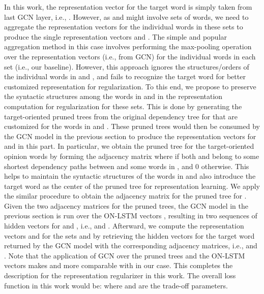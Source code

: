 \documentclass[11pt,a4paper]{article}
\begin{document}
In this work, the representation vector for the target word is simply taken from last GCN layer, i.e., . However, as  and  might involve sets of words, we need to aggregate the representation vectors for the individual words in these sets to produce the single representation vectors  and . The simple and popular aggregation method in this case involves performing the max-pooling operation over the representation vectors (i.e., from GCN) for the individual words in each set (i.e., our baseline). However, this approach ignores the structures/orders of the individual words in  and , and fails to recognize the target word for better customized representation for regularization. To this end, we propose to preserve the syntactic structures among the words in  and  in the representation computation for regularization for these sets. This is done by generating the target-oriented pruned trees from the original dependency tree for  that are customized for the words in  and . These pruned trees would then be consumed by the GCN model in the previous section to produce the representation vectors for  and  in this part. In particular, we obtain the pruned tree for the target-oriented opinion words  by forming the adjacency matrix  where  if both  and  belong to some shortest dependency paths between  and some words in , and 0 otherwise. This helps to maintain the syntactic structures of the words in  and also introduce the target word  as the center of the pruned tree for representation learning. We apply the similar procedure to obtain the adjacency matrix  for the pruned tree for . Given the two adjacency matrices for the pruned trees, the GCN model in the previous section is run over the ON-LSTM vectors , resulting in two sequences of hidden vectors for  and , i.e.,  and . Afterward, we compute the representation vectors  and  for the sets  and  by retrieving the hidden vectors for the target word returned by the GCN model with the corresponding adjacency matrices, i.e.,  and . Note that the application of GCN over the pruned trees and the ON-LSTM vectors makes  and  more comparable with  in our case. This completes the description for the representation regularizer in this work. The overall loss function in this work would be:  where  and  are the trade-off parameters.
\end{document}
